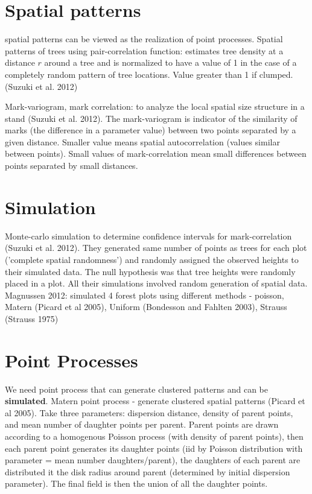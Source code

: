 \documentclass{article}
\begin{document}
\section{Spatial patterns}
spatial patterns can be viewed as the realization of point processes.
Spatial patterns of trees using pair-correlation function: estimates tree density at a distance $r$ around a tree and is normalized to have a value of 1 in the case of a completely random pattern of tree locations.  Value greater than 1 if clumped. (Suzuki et al. 2012)

 
Mark-variogram, mark correlation: to analyze the local spatial size structure in a stand (Suzuki et al. 2012).
The mark-variogram is indicator of the similarity of marks (the difference in a parameter value) between two points separated by a given distance.  Smaller value means spatial autocorrelation (values similar between points).  Small values of mark-correlation mean small differences between points separated by small distances.

\section{Simulation}
Monte-carlo simulation to determine confidence intervals for mark-correlation (Suzuki et al. 2012).  They generated same number of points as trees for each plot ('complete spatial randomness') and randomly assigned the observed heights to their simulated data.  The null hypothesis was that tree heights were randomly placed in a plot. All their simulations involved random generation of spatial data.
\\
Magnussen 2012: simulated 4 forest plots using different methods - poisson, Matern (Picard et al 2005), Uniform (Bondesson and Fahlten 2003),
Strauss (Strauss 1975)

\section{Point Processes}
We need point process that can generate clustered patterns and can be \textbf{simulated}.
Matern point process - generate clustered spatial patterns (Picard et al 2005).  Take three parameters: dispersion distance, density of parent points, and mean number of daughter points per parent.  Parent points are drawn according to a homogenous Poisson process (with density of parent points), then each parent point generates its daughter points (iid by Poisson distribution with parameter = mean number daughters/parent), the daughters of each parent are distributed it the disk radius around parent (determined by initial dispersion parameter).  The final field is then the union of all the daughter points.

  
\end{document}
